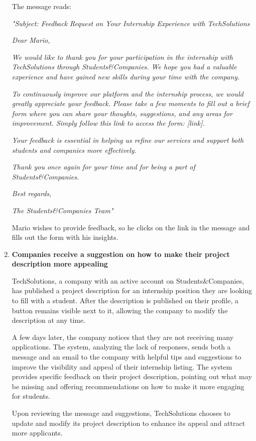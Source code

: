 \begin{enumerate}
    The message reads:

    \textit{"Subject: Feedback Request on Your Internship Experience with TechSolutions}

    \textit{Dear Mario,}

    \textit{We would like to thank you for your participation in the internship with TechSolutions through Students\&Companies. We hope you had a valuable experience and have gained new skills during your time with the company.}

    \textit{To continuously improve our platform and the internship process, we would greatly appreciate your feedback. Please take a few moments to fill out a brief form where you can share your thoughts, suggestions, and any areas for improvement. Simply follow this link to access the form: [link].}

    \textit{Your feedback is essential in helping us refine our services and support both students and companies more effectively.}

    \textit{Thank you once again for your time and for being a part of Students\&Companies.}

    \textit{Best regards,}
    
    \textit{The Students\&Companies Team"}

    Mario wishes to provide feedback, so he clicks on the link in the message and fills out the form with his insights.

    \item \textbf{Companies receive a suggestion on how to make their project description more appealing}

    TechSolutions, a company with an active account on Students\&Companies, has published a project description for an internship position they are looking to fill with a student. After the description is published on their profile, a button remains visible next to it, allowing the company to modify the description at any time.

    A few days later, the company notices that they are not receiving many applications. The system, analyzing the lack of responses, sends both a message and an email to the company with helpful tips and suggestions to improve the visibility and appeal of their internship listing. The system provides specific feedback on their project description, pointing out what may be missing and offering recommendations on how to make it more engaging for students.

    Upon reviewing the message and suggestions, TechSolutions chooses to update and modify its project description to enhance its appeal and attract more applicants.
    

\end{enumerate}
